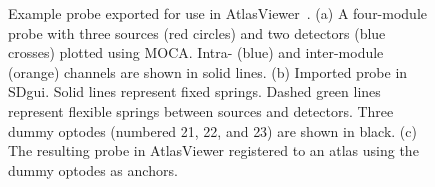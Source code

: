 \begin{figure}
    \begin{center}
    \end{center}
    \caption{Example probe exported for use in AtlasViewer~\cite{Aasted2015}. (a) A four-module probe with three sources (red circles) and two detectors (blue crosses) plotted using MOCA. Intra- (blue) and inter-module (orange) channels are shown in solid lines. (b) Imported probe in SDgui. Solid lines represent fixed springs. Dashed green lines represent flexible springs between sources and detectors. Three dummy optodes (numbered 21, 22, and 23) are shown in black. (c) The resulting probe in AtlasViewer registered to an atlas using the dummy optodes as anchors.}
    \label{fig:SDoutput}
\end{figure} 




